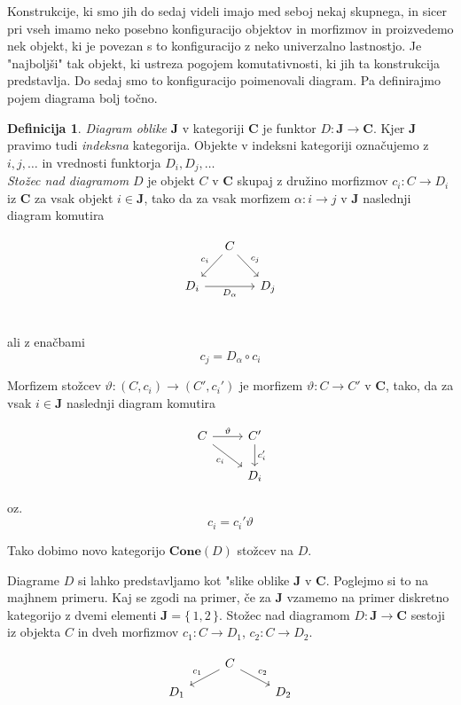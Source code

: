 \documentclass[12pt,a4paper]{book}
\theoremstyle{definition}
\newtheorem{definicija}{Definicija}[chapter]
\theoremstyle{plain}
\theoremstyle{definition}
\theoremstyle{remark}
\newcommand{\cat}[1]{\textbf{#1}}
\renewcommand{\set}[1]{\{\,#1\,\}}
\begin{document}
Konstrukcije, ki smo jih do sedaj videli imajo med seboj nekaj skupnega, in sicer pri vseh imamo neko posebno konfiguracijo objektov in morfizmov in proizvedemo nek objekt, ki je povezan s to konfiguracijo z neko univerzalno lastnostjo. Je "najboljši" tak objekt, ki ustreza pogojem komutativnosti, ki jih ta konstrukcija predstavlja. Do sedaj smo to konfiguracijo poimenovali diagram. Pa definirajmo pojem diagrama bolj točno.

\begin{definicija}
\textit{Diagram oblike} $\cat{J}$ v kategoriji $\cat{C}$ je funktor $D : \cat{J} \to \cat{C}$. Kjer $\cat{J}$ pravimo tudi \textit{indeksna} kategorija. Objekte v indeksni kategoriji označujemo z $i,j,\ldots$ in vrednosti funktorja $D_i,D_j,\ldots$ \\
\textit{Stožec nad diagramom} $D$ je objekt $C$ v $\cat{C}$ skupaj z družino morfizmov $c_i : C \to D_i$ iz $\cat{C}$ za vsak objekt $i \in \cat{J}$, tako da za vsak morfizem $\alpha : i \to j$ v $\cat{J}$ naslednji diagram komutira

$$\begin{tikzcd}[column sep=small]
& C \ar[dl, "c_i"'] \ar[dr, "c_j"] & \\
D_i \ar[rr, "D_\alpha"'] & & D_j \\
\end{tikzcd}$$

ali z enačbami $$c_j = D_\alpha \circ c_i$$

Morfizem stožcev $\vartheta : (C, c_i) \to (C', c_i')$ je morfizem $\vartheta : C \to C'$ v $\cat{C}$, tako, da za vsak $i \in \cat{J}$ naslednji diagram komutira

$$\begin{tikzcd}
C \ar[dr, "c_i"'] \ar[r, "\vartheta"] & C' \ar[d, "c_i'"] \\
& D_i
\end{tikzcd}$$

oz. $$c_i = c_i' \vartheta$$

Tako dobimo novo kategorijo $\cat{Cone}(D)$ stožcev na $D$.
\end{definicija}

Diagrame $D$ si lahko predstavljamo kot "slike oblike $\cat{J}$ v $\cat{C}$. Poglejmo si to na majhnem primeru. Kaj se zgodi na primer, če za $\cat{J}$ vzamemo na primer diskretno kategorijo z dvemi elementi $\cat{J} = \set{1,2}$. Stožec nad diagramom $D : \cat{J} \to \cat{C}$ sestoji iz objekta $C$ in dveh morfizmov $c_1 : C \to D_1$, $c_2 : C \to D_2$.

$$\begin{tikzcd}[column sep=normal, row sep=small]
& C \ar[dl, "c_1"'] \ar[dr, "c_2"] & \\
D_1 && D_2 \\
\end{tikzcd}$$
\end{document}
